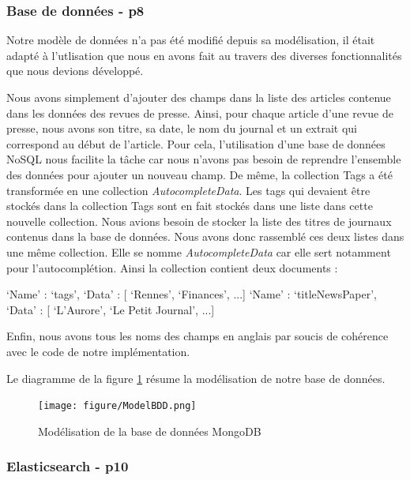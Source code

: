 \subsubsection{Base de données - p8}

Notre modèle de données n'a pas été modifié depuis sa modélisation, il était adapté à l'utlisation que nous en avons fait au travers des diverses fonctionnalités que nous devions développé. 


Nous avons simplement d'ajouter des champs dans la liste des articles contenue dans les données des revues de presse. Ainsi, pour chaque article d'une revue de presse, nous avons son titre, sa date, le nom du journal et un extrait qui correspond au début de l'article. Pour cela, l'utilisation d'une base de données NoSQL nous facilite la tâche car nous n'avons pas besoin de reprendre l'ensemble des données pour ajouter un nouveau champ. De même, la collection Tags a été transformée en une collection \textit{AutocompleteData}. Les tags qui devaient être stockés dans la collection Tags sont en fait stockés dans une liste dans cette nouvelle collection. Nous avions besoin de stocker la liste des titres de journaux contenus dans la base de données. Nous avons donc rassemblé ces deux listes dans une même collection. Elle se nomme \textit{AutocompleteData} car elle sert notamment pour l'autocomplétion. Ainsi la collection contient deux documents :

\begin{verbatimtab}[3]
{
	‘Name’ : ‘tags’,
	‘Data’ : [ ‘Rennes’, ‘Finances’, ...]
}
{
	‘Name’ : ‘titleNewsPaper’,
	‘Data’ : [ ‘L'Aurore’, ‘Le Petit Journal’, ...]
}
\end{verbatimtab}

Enfin, nous avons tous les noms des champs en anglais par soucis de cohérence avec le code de notre implémentation.

Le diagramme de la figure \ref{modelbdd} résume la modélisation de notre base de données.

\begin{figure}[H]
        \centering
        \texttt{[image: figure/ModelBDD.png]}
            \caption{Modélisation de la base de données MongoDB}
            \label{modelbdd}
\end{figure}

\subsubsection{Elasticsearch - p10}

